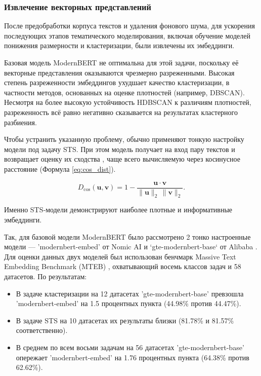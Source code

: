 \subsubsection{Извлечение векторных представлений}
После предобработки корпуса текстов и удаления фонового шума, для ускорения последующих этапов тематического моделирования,
включая обучение моделей понижения размерности и кластеризации, были извлечены их эмбеддинги.

Базовая модель ModernBERT не оптимальна для этой задачи, поскольку её векторные представления оказываются чрезмерно разреженными.
Высокая степень разреженности эмбеддингов ухудшает качество кластеризации, в частности методов, основанных на оценке плотностей
(например, DBSCAN). Несмотря на более высокую устойчивость HDBSCAN к различиям плотностей, разреженность всё равно негативно
сказывается на результатах кластерного разбиения.

Чтобы устранить указанную проблему, обычно применяют тонкую настройку модели под задачу STS. При этом модель получает на вход пару
текстов и возвращает оценку их сходства \parencite{MTEB2023}, чаще всего вычисляемую через косинусное расстояние (Формула \ref{eq:cos_dist}).

\begin{equation}\label{eq:cos_dist}
    D_{\cos}(\mathbf{u}, \mathbf{v})
    = 1 - \frac{\mathbf{u} \cdot \mathbf{v}}
                 {\|\mathbf{u}\|_2 \,\|\mathbf{v}\|_2}.
\end{equation}

Именно STS‑модели демонстрируют наиболее плотные и информативные эмбеддинги.

Так, для базовой модели ModernBERT было рассмотрено 2 тонко настроенные модели --- 'modernbert-embed' от Nomic AI \parencite{nomic2024}
и `gte-modernbert-base` от Alibaba \parencite{MGTE2023,MGTE2024}. Для оценки данных двух моделей был использован бенчмарк Massive
Text Embedding Benchmark (MTEB) \parencite{MTEB2023}, охватывающий восемь классов задач и 58 датасетов. По результатам:

\begin{itemize}
    \item В задаче кластеризации на 12 датасетах 'gte-modernbert-base' превзошла 'modernbert-embed' на 1.5 процентных пункта (44.98\% против 44.47\%).
    \item В задаче STS на 10 датасетах их результаты близки (81.78\% и 81.57\% соответственно).
    \item В среднем по всем восьми задачам на 56 датасетах 'gte-modernbert-base' опережает 'modernbert-embed' на 1.76 процентных
    пункта (64.38\% против 62.62\%).
\end{itemize}

